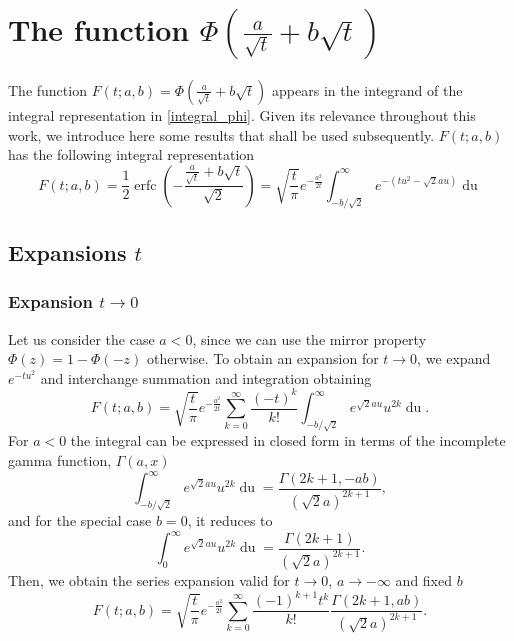\documentclass[10pt,a4paper,oneside]{article}
\DeclareMathOperator{\erfc}{erfc}
\numberwithin{equation}{section}
\begin{document}
\section{The function $\Phi\left(\frac{a}{\sqrt{t}} + b\sqrt{t}\right)$}

The function $F(t; a, b) = \Phi\left(\frac{a}{\sqrt{t}} + b\sqrt{t}\right)$ appears in the integrand of the integral representation in \eqref{integral_phi}. Given its relevance throughout this work, we introduce here some results that shall be used subsequently. $F(t; a, b)$ has the following integral representation \cite[\S 7.7.6]{NIST:DLMF}
\begin{equation}\label{integral_erfc_ab}
F(t; a, b) = \frac{1}{2}\erfc\left(-\frac{\frac{a}{\sqrt{t}} + b\sqrt{t}}{\sqrt{2}}\right)  = \sqrt{\frac{t}{\pi}} e^{-\frac{a^2}{2t}} \int_{-b/\sqrt{2}}^{\infty} e^{-(tu^2 - \sqrt{2}au)} \mathop{du}
\end{equation}

\subsection{Expansions $t$}

\subsubsection{Expansion $t \to 0$}

Let us consider the case $a < 0$, since we can use the mirror property $\Phi(z) = 1 - \Phi(-z)$ otherwise. To obtain an expansion for $t \to 0$, we expand $e^{-tu^2}$ and interchange summation and integration obtaining
\begin{equation*}
F(t; a, b) = \sqrt{\frac{t}{\pi}} e^{-\frac{a^2}{2t}} \sum_{k=0}^{\infty} \frac{(-t)^k}{k!}\int_{-b/\sqrt{2}}^{\infty} e^{\sqrt{2}a u} u^{2k}\mathop{du}.
\end{equation*}
For $a < 0$ the integral can be expressed in closed form in terms of the incomplete gamma function, $\Gamma(a, x)$
\begin{equation*}
\int_{-b/\sqrt{2}}^{\infty} e^{\sqrt{2}a u} u^{2k}\mathop{du} = \frac{\Gamma(2k+1, -ab)}{(\sqrt{2}a)^{2k+1}},
\end{equation*}
and for the special case $b=0$, it reduces to
\begin{equation*}
\int_{0}^{\infty} e^{\sqrt{2}a u} u^{2k}\mathop{du} = \frac{\Gamma(2k+1)}{(\sqrt{2}a)^{2k+1}}.
\end{equation*}
Then, we obtain the series expansion valid for $t \to 0$, $a \to -\infty$ and fixed $b$
\begin{equation}\label{phi_expansion_incgamma_t_small}
F(t; a, b) = \sqrt{\frac{t}{\pi}} e^{-\frac{a^2}{2t}} \sum_{k=0}^{\infty} \frac{(-1)^{k+1} t^k}{k!}\frac{\Gamma(2k + 1, ab)}{(\sqrt{2}a)^{2k+1}}.
\end{equation}
\end{document}
